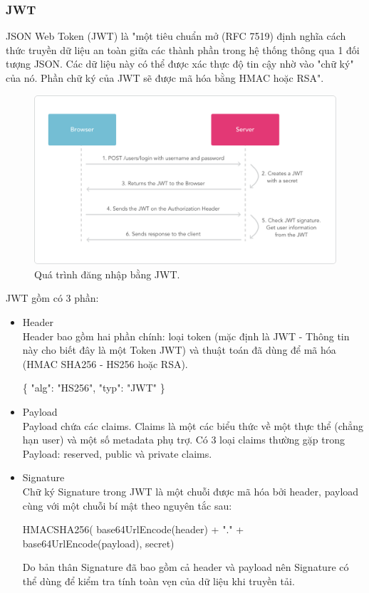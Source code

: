 \documentclass[a4paper,12pt,oneside]{article}
\begin{document}
\subsubsection{JWT}
\noindent JSON Web Token (JWT) là "một tiêu chuẩn mở (RFC 7519) định nghĩa cách thức truyền dữ liệu an toàn giữa các thành phần trong hệ thống thông qua 1 đối tượng JSON. Các dữ liệu này có thể được xác thực độ tin cậy nhờ vào "chữ ký" của nó. Phần chữ ký của JWT sẽ được mã hóa bằng HMAC hoặc RSA"\cite{jwt}.

\begin{figure}[H]
	\centering
	\includegraphics[scale=.35]{hinh/jwt2.png}
	\caption{Quá trình đăng nhập bằng JWT\cite{jwt}.}
	\label{fig:jwt2}
\end{figure}

JWT gồm có 3 phần: 
\begin{itemize}
\item Header\\
Header bao gồm hai phần chính: loại token (mặc định là JWT - Thông tin này cho biết đây là một Token JWT) và thuật toán đã dùng để mã hóa (HMAC SHA256 - HS256 hoặc RSA). 

\begin{center}
\{ "alg": "HS256", "typ": "JWT" \} 
\end{center}

\item Payload\\ 
Payload chứa các claims. Claims là một các biểu thức về một thực thể (chẳng hạn user) và một số metadata phụ trợ. Có 3 loại claims thường gặp trong Payload: reserved, public và private claims. 
\item Signature\\ 
Chữ ký Signature trong JWT là một chuỗi được mã hóa bởi header, payload cùng với một chuỗi bí mật theo nguyên tắc sau: 
\begin{center}
HMACSHA256(  base64UrlEncode(header) + "." +  base64UrlEncode(payload),  secret) 
\end{center}
Do bản thân Signature đã bao gồm cả header và payload nên Signature có thể dùng để kiểm tra tính toàn vẹn của dữ liệu khi truyền tải. 
 
\end{itemize}
\end{document}
